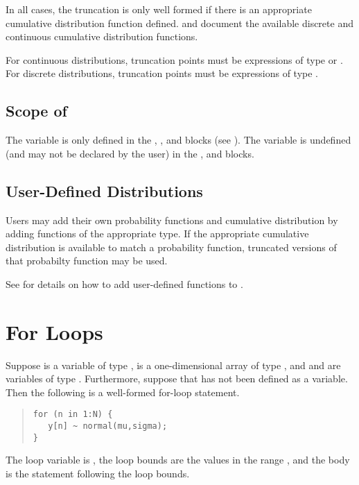 In all cases, the truncation is only well formed if there is an
appropriate cumulative distribution function defined.
 and
 document the available discrete
and continuous cumulative distribution functions.

For continuous distributions, truncation points must be expressions of
type  or .  For discrete distributions, truncation
points must be expressions of type .


\subsection{Scope of\, }

The variable  is only defined in the ,
, and  blocks (see
).  The variable  is undefined (and
may not be declared by the user) in the ,  and  blocks.

\subsection{User-Defined Distributions}

Users may add their own probability functions and cumulative
distribution by adding functions of the appropriate type.  If the
appropriate cumulative distribution is available to match a
probability function, truncated versions of that probabilty function
may be used. 

See  for details on how to add
user-defined functions to \Stan.


\section{For Loops}

Suppose
 is a variable of type ,  is a
one-dimensional array of type , and  and
 are variables of type .  Furthermore, suppose
that  has not been defined as a variable. Then the following
is a well-formed for-loop statement.
%
\begin{quote}
\begin{Verbatim}
for (n in 1:N) {
   y[n] ~ normal(mu,sigma);
}
\end{Verbatim}
\end{quote}
%
The loop variable is , the loop bounds are the values in the
range , and the body is the statement following the
loop bounds.  

